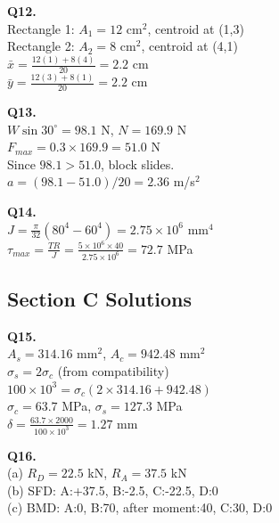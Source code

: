 \documentclass[12pt,a4paper]{article}
\newcommand{\sol}[1]{
\begin{solutionbox}
#1
\end{solutionbox}
}
\begin{document}
\sol{\textbf{Q12.} \\
Rectangle 1: $A_1=12$ cm$^2$, centroid at (1,3) \\
Rectangle 2: $A_2=8$ cm$^2$, centroid at (4,1) \\
$\bar{x} = \frac{12(1)+8(4)}{20} = 2.2$ cm \\
$\bar{y} = \frac{12(3)+8(1)}{20} = 2.2$ cm}

\sol{\textbf{Q13.} \\
$W\sin 30^\circ = 98.1$ N, $N = 169.9$ N \\
$F_{max} = 0.3 \times 169.9 = 51.0$ N \\
Since $98.1 > 51.0$, block slides. \\
$a = (98.1-51.0)/20 = 2.36$ m/s$^2$}

\sol{\textbf{Q14.} \\
$J = \frac{\pi}{32}(80^4-60^4) = 2.75\times 10^6$ mm$^4$ \\
$\tau_{max} = \frac{TR}{J} = \frac{5\times 10^6 \times 40}{2.75\times 10^6} = 72.7$ MPa}

\subsection*{Section C Solutions}

\sol{\textbf{Q15.} \\
$A_s = 314.16$ mm$^2$, $A_c = 942.48$ mm$^2$ \\
$\sigma_s = 2\sigma_c$ (from compatibility) \\
$100\times 10^3 = \sigma_c(2\times 314.16 + 942.48)$ \\
$\sigma_c = 63.7$ MPa, $\sigma_s = 127.3$ MPa \\
$\delta = \frac{63.7 \times 2000}{100\times 10^3} = 1.27$ mm}

\sol{\textbf{Q16.} \\
(a) $R_D = 22.5$ kN, $R_A = 37.5$ kN \\
(b) SFD: A:+37.5, B:-2.5, C:-22.5, D:0 \\
(c) BMD: A:0, B:70, after moment:40, C:30, D:0}

\newpage
\end{document}
